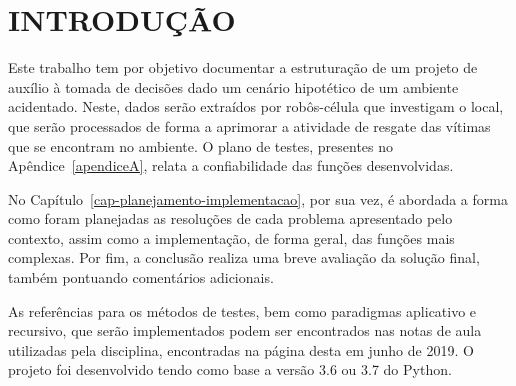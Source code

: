 \chapter*[INTRODUÇÃO]{INTRODUÇÃO}\label{cap-introducao}

Este trabalho tem por objetivo documentar a estruturação de um projeto de auxílio à tomada de decisões dado um cenário hipotético de um ambiente acidentado. Neste, dados serão extraídos por robôs-célula que investigam o local, que serão processados de forma a aprimorar a atividade de resgate das vítimas que se encontram no ambiente. O plano de testes, presentes no Apêndice~\ref{apendiceA}, relata a confiabilidade das funções desenvolvidas.

No Capítulo~\ref{cap-planejamento-implementacao}, por sua vez, é abordada a forma como foram planejadas as resoluções de cada problema apresentado pelo contexto, assim como a implementação, de forma geral, das funções mais complexas. Por fim, a conclusão realiza uma breve avaliação da solução final, também pontuando comentários adicionais.

As referências para os métodos de testes, bem como paradigmas aplicativo e recursivo, que serão implementados podem ser encontrados nas notas de aula utilizadas pela disciplina, encontradas na página desta em junho de 2019. O projeto foi desenvolvido tendo como base a versão 3.6 ou 3.7 do Python.
